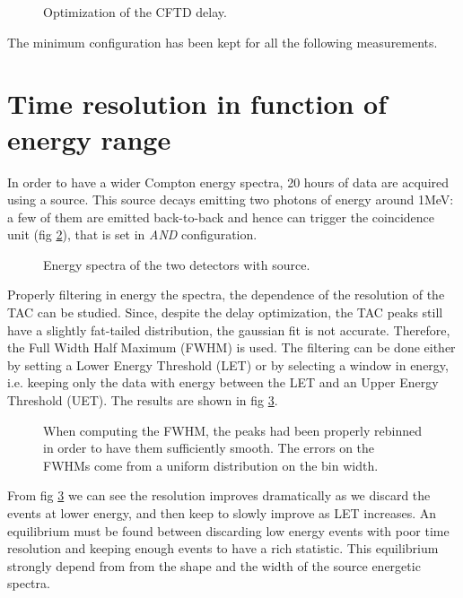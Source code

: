 \documentclass[11pt,a4 paper]{article}
\begin{document}
\begin{figure}[H]
    \centering
    \caption{Optimization of the CFTD delay.}
    \label{fig:CFTD:delay}
\end{figure}

The minimum configuration has been kept for all the following measurements.

\section{Time resolution in function of energy range}
In order to have a wider Compton energy spectra, 20 hours of data are acquired using a  source. This source decays emitting two photons of energy around 1\si{\mega\electronvolt}: a few of them are emitted back-to-back and hence can trigger the coincidence unit (fig \ref{fig:Co:spectra}), that is set in \emph{AND} configuration.\\
\begin{figure}[H]
    \centering
    \caption{Energy spectra of the two detectors with  source.}
    \label{fig:Co:spectra}
\end{figure}

Properly filtering in energy the spectra, the dependence of the resolution of the TAC can be studied. Since, despite the delay optimization, the TAC peaks still have a slightly fat-tailed distribution, the gaussian fit is not accurate. Therefore, the Full Width Half Maximum (FWHM) is used.
The filtering can be done either by setting a Lower Energy Threshold (LET) or by selecting a window in energy, i.e. keeping only the data with energy between the LET and an Upper Energy Threshold (UET). The results are shown in fig \ref{fig:Co:results}.

\begin{figure}[H]
    \centering
    \caption{When computing the FWHM, the peaks had been properly rebinned in order to have them sufficiently smooth. The errors on the FWHMs come from a uniform distribution on the bin width.}
    \label{fig:Co:results}
\end{figure}

From fig \ref{fig:Co:results} we can see the resolution improves dramatically as we discard the events at lower energy, and then keep to slowly improve as LET increases. An equilibrium must be found between discarding low energy events with poor time resolution and keeping enough events to have a rich statistic. This equilibrium strongly depend from from the shape and the width of the source energetic spectra.
\end{document}
